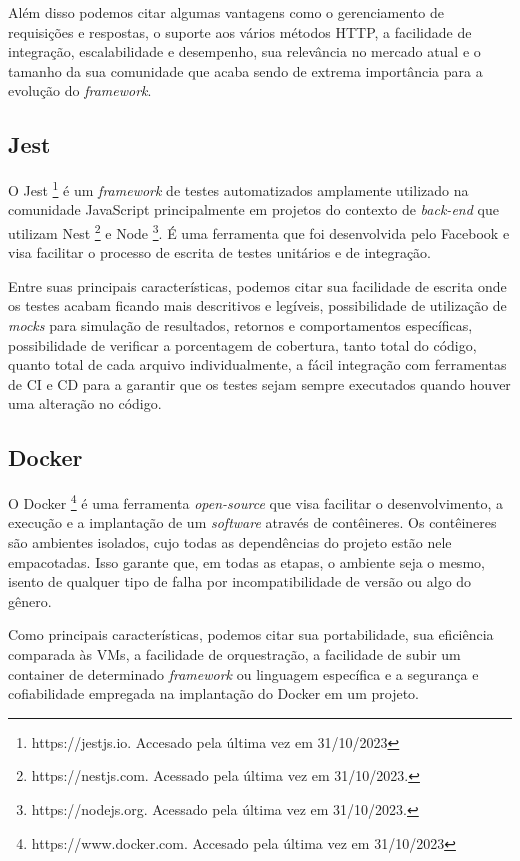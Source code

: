 Além disso podemos citar algumas vantagens como o gerenciamento de requisições e respostas, 
o suporte aos vários métodos HTTP, a facilidade de integração, escalabilidade e desempenho, 
sua relevância no mercado atual e o tamanho da sua comunidade que acaba sendo de extrema 
importância para a evolução do \textit{framework}. 

\subsection{Jest}

O Jest \footnote{https://jestjs.io. Accesado pela última vez em 31/10/2023} é um \textit{framework} 
de testes automatizados amplamente utilizado na comunidade JavaScript principalmente em projetos 
do contexto de \textit{back-end} que utilizam Nest \footnote{https://nestjs.com. Acessado pela última vez em 31/10/2023.} 
e Node \footnote{https://nodejs.org. Acessado pela última vez em 31/10/2023.}. É uma ferramenta que 
foi desenvolvida pelo Facebook e visa facilitar o processo de escrita de testes unitários e de integração. 

Entre suas principais características, podemos citar sua facilidade de escrita onde os testes acabam 
ficando mais descritivos e legíveis, possibilidade de utilização de \textit{mocks} para simulação de 
resultados, retornos e comportamentos específicas, possibilidade de verificar a porcentagem de cobertura, 
tanto total do código, quanto total de cada arquivo individualmente, a fácil integração com ferramentas de 
CI e CD para a garantir que os testes sejam sempre executados quando houver uma alteração no código.

\subsection{Docker}

O Docker \footnote{https://www.docker.com. Accesado pela última vez em 31/10/2023} é uma ferramenta \textit{open-source} que visa facilitar o desenvolvimento, a execução e a 
implantação de um \textit{software} através de contêineres. Os contêineres são ambientes isolados, 
cujo todas as dependências do projeto estão nele empacotadas. Isso garante que, em todas as etapas, 
o ambiente seja o mesmo, isento de qualquer tipo de falha por incompatibilidade de versão ou algo 
do gênero.

Como principais características, podemos citar sua portabilidade, sua eficiência comparada 
às VMs, a facilidade de orquestração, a facilidade de subir um container de determinado \textit{framework} 
ou linguagem específica e a segurança e cofiabilidade empregada na implantação do Docker em um projeto.

